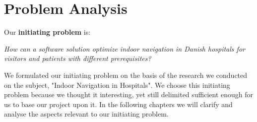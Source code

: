 \chapter{Problem Analysis} \label{cha:problem_analysis}

Our \textbf{initiating problem} is:

\begin{displayquote}
    \textit{How can a software solution optimize indoor navigation in Danish hospitals for visitors and patients with different prerequisites?}\label{sub:init}
\end{displayquote}

We formulated our initiating problem on the basis of the research we conducted on the subject, "Indoor Navigation in Hospitals". We choose this initiating problem because we thought it interesting, yet still delimited sufficient enough for us to base our project upon it. In the following chapters we will clarify and analyse the aspects relevant to our initiating problem.










